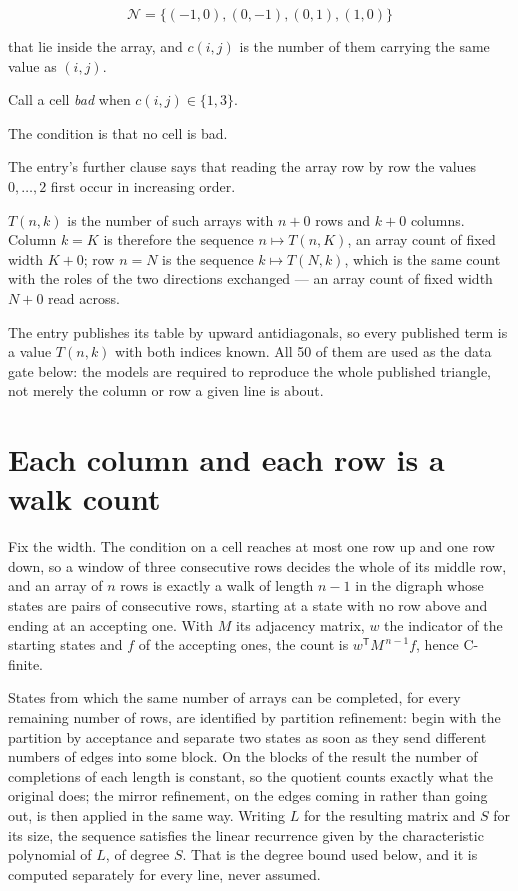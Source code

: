 \documentclass[11pt]{article}
\theoremstyle{definition}
\begin{document}
\[\mathcal{N} = \{(-1,0), (0,-1), (0,1), (1,0)\}\]

that lie inside the array, and $c(i,j)$ is the number of them carrying the same value as $(i,j)$.

Call a cell {\itshape bad} when $c(i,j) \in \{1, 3\}$.

The condition is that no cell is bad.

The entry's further clause says that reading the array row by row the values $0,\dots,2$ first occur in increasing order.

$T(n,k)$ is the number of such arrays with $n + 0$ rows and $k + 0$ columns. Column $k = K$ is therefore the sequence $n \mapsto T(n,K)$, an array count of fixed width $K + 0$; row $n = N$ is the sequence $k \mapsto T(N,k)$, which is the same count with the roles of the two directions exchanged --- an array count of fixed width $N + 0$ read across.

The entry publishes its table by upward antidiagonals, so every published term is a value $T(n,k)$ with both indices known. All 50 of them are used as the data gate below: the models are required to reproduce the whole published triangle, not merely the column or row a given line is about.

\section{Each column and each row is a walk count}

Fix the width. The condition on a cell reaches at most one row up and one row down, so a window of three consecutive rows decides the whole of its middle row, and an array of $n$ rows is exactly a walk of length $n-1$ in the digraph whose states are pairs of consecutive rows, starting at a state with no row above and ending at an accepting one. With $M$ its adjacency matrix, $w$ the indicator of the starting states and $f$ of the accepting ones, the count is $w^{\mathsf T}M^{\,n-1}f$, hence C-finite.

States from which the same number of arrays can be completed, for every remaining number of rows, are identified by partition refinement: begin with the partition by acceptance and separate two states as soon as they send different numbers of edges into some block. On the blocks of the result the number of completions of each length is constant, so the quotient counts exactly what the original does; the mirror refinement, on the edges coming in rather than going out, is then applied in the same way. Writing $L$ for the resulting matrix and $S$ for its size, the sequence satisfies the linear recurrence given by the characteristic polynomial of $L$, of degree $S$. That is the degree bound used below, and it is computed separately for every line, never assumed.
\end{document}
